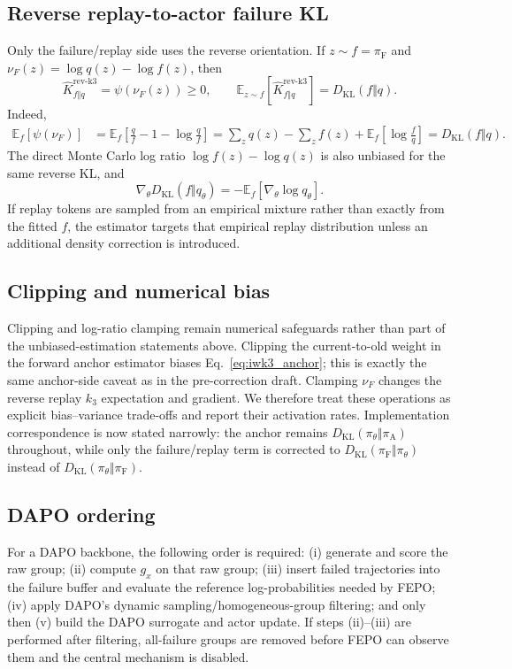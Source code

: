 \documentclass{article}
\newcommand{\pol}{\pi_\theta}
\newcommand{\anchorpol}{\pi_{\mathrm A}}
\newcommand{\failpol}{\pi_{\mathrm F}}
\newcommand{\KL}{D_{\mathrm{KL}}}
\newcommand{\E}{\mathbb{E}}
\newcommand{\FEPO}{\textsc{FEPO}\xspace}
\begin{document}
\subsection{Reverse replay-to-actor failure KL}
Only the failure/replay side uses the reverse orientation. If $z\sim f=\failpol$ and $\nu_F(z)=\log q(z)-\log f(z)$, then
\begin{equation}
\widehat K_{f\Vert q}^{\mathrm{rev\mbox{-}k3}}=\psi(\nu_F(z))\ge0,
\qquad
\E_{z\sim f}\left[\widehat K_{f\Vert q}^{\mathrm{rev\mbox{-}k3}}\right]=\KL(f\Vert q).
\label{eq:revk3_appendix}
\end{equation}
Indeed,
\begin{align}
\E_f[\psi(\nu_F)]
&=\E_f\left[\frac{q}{f}-1-\log\frac{q}{f}\right]
=\sum_zq(z)-\sum_zf(z)+\E_f\left[\log\frac{f}{q}\right]
=\KL(f\Vert q).
\end{align}
The direct Monte Carlo log ratio $\log f(z)-\log q(z)$ is also unbiased for the same reverse KL, and
\begin{equation}
\nabla_\theta\KL(f\Vert q_\theta)=-\E_f[\nabla_\theta\log q_\theta].
\end{equation}
If replay tokens are sampled from an empirical mixture rather than exactly from the fitted $f$, the estimator targets that empirical replay distribution unless an additional density correction is introduced.

\subsection{Clipping and numerical bias}
Clipping and log-ratio clamping remain numerical safeguards rather than part of the unbiased-estimation statements above. Clipping the current-to-old weight in the forward anchor estimator biases Eq.~\eqref{eq:iwk3_anchor}; this is exactly the same anchor-side caveat as in the pre-correction draft. Clamping $\nu_F$ changes the reverse replay $k_3$ expectation and gradient. We therefore treat these operations as explicit bias--variance trade-offs and report their activation rates. Implementation correspondence is now stated narrowly: the anchor remains $\KL(\pol\Vert\anchorpol)$ throughout, while only the failure/replay term is corrected to $\KL(\failpol\Vert\pol)$ instead of $\KL(\pol\Vert\failpol)$.

\subsection{DAPO ordering}
For a DAPO backbone, the following order is required: (i) generate and score the raw group; (ii) compute $g_x$ on that raw group; (iii) insert failed trajectories into the failure buffer and evaluate the reference log-probabilities needed by \FEPO; (iv) apply DAPO's dynamic sampling/homogeneous-group filtering; and only then (v) build the DAPO surrogate and actor update. If steps (ii)--(iii) are performed after filtering, all-failure groups are removed before \FEPO can observe them and the central mechanism is disabled.
\end{document}
